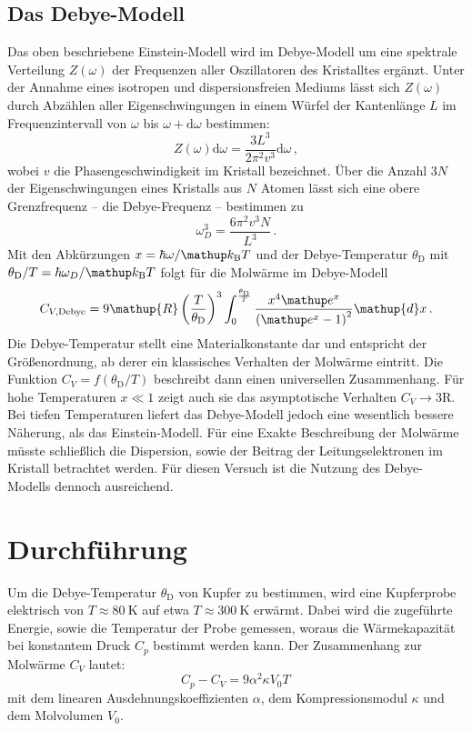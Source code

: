 \subsection{Das Debye-Modell}
\label{subsec:debye}
Das oben beschriebene Einstein-Modell wird im Debye-Modell um eine spektrale
Verteilung $Z(\omega)$ der Frequenzen aller Oszillatoren des Kristalltes
ergänzt.
Unter der Annahme eines isotropen und dispersionsfreien Mediums lässt sich
$Z(\omega)$ durch Abzählen aller Eigenschwingungen in einem Würfel
der Kantenlänge $L$ im Frequenzintervall von $\omega$ bis
$\omega+\mathup{d}\omega$ bestimmen:
\begin{equation}
    \label{eqn:z}
    Z(\omega)\mathup{d}\omega = \frac{3L^3}{2\pi^2 v^3} \mathup{d}\omega\,,
\end{equation}
wobei $v$ die Phasengeschwindigkeit im Kristall bezeichnet.
Über die Anzahl $3N$ der Eigenschwingungen eines Kristalls aus $N$ Atomen
lässt sich eine obere Grenzfrequenz -- die Debye-Frequenz -- bestimmen zu
\begin{equation}
    \label{eqn:omega_debye}
    \omega_D^3 = \frac{6\pi^2 v^3 N}{L^3}\,.
\end{equation}
Mit den Abkürzungen $x = \hbar\omega/\kb T$ und der Debye-Temperatur
$\theta_\text{D}$ mit $\theta_\text{D}/T = \hbar\omega_D/\kb T$ folgt
für die Molwärme im Debye-Modell
\begin{equation}
    \label{eqn:cv_debye}
    C_{V,\text{Debye}} =
    9\mathup{R}\left(\frac{T}{\theta_\text{D}}\right)^3
    \int_0^{\frac{\theta_\text{D}}{T}}
    \frac{x^4\e^x}{\left(\e^x-1\right)^2}\mathup{d}x\,.
\end{equation}
Die Debye-Temperatur stellt eine Materialkonstante dar und entspricht der
Größenordnung, ab derer ein klassisches Verhalten der Molwärme eintritt.
Die Funktion $C_V = f(\theta_\text{D}/T)$ beschreibt dann einen universellen
Zusammenhang. Für hohe Temperaturen $x \ll \num{1}$ zeigt auch sie das
asymptotische Verhalten $C_V\to 3\mathup{R}$.
Bei tiefen Temperaturen liefert das Debye-Modell jedoch eine wesentlich
bessere Näherung, als das Einstein-Modell.
Für eine Exakte Beschreibung der Molwärme müsste schließlich die Dispersion,
sowie der Beitrag der Leitungselektronen im Kristall betrachtet werden.
Für diesen Versuch ist die Nutzung des Debye-Modells dennoch ausreichend.

\section{Durchführung}
\label{sec:durchführung}
Um die Debye-Temperatur $\theta_\text{D}$ von Kupfer zu bestimmen, wird
eine Kupferprobe elektrisch von $T \approx \SI{80}{\kelvin}$ auf etwa
$T \approx \SI{300}{\kelvin}$ erwärmt.
Dabei wird die zugeführte Energie, sowie die Temperatur der Probe gemessen,
woraus die Wärmekapazität bei konstantem Druck $C_p$ bestimmt werden kann.
Der Zusammenhang zur Molwärme $C_V$ lautet:
\begin{equation}
    \label{eqn:cp_cv}
    C_p - C_V = 9\alpha^2\kappa V_0 T\,
\end{equation}
mit dem linearen Ausdehnungskoeffizienten $\alpha$, dem Kompressionsmodul
$\kappa$ und dem Molvolumen $V_0$.

